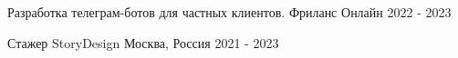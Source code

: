

\begin{cventries}

  \cventry
    {Разработка телеграм-ботов для частных клиентов.} %
    {Фриланс} %
    {Онлайн} %
    {2022 - 2023} %
    {}
    
  \cventry
    {Стажер} %
    {StoryDesign} %
    {Москва, Россия} %
    {2021 - 2023} %
    {}

\end{cventries}
